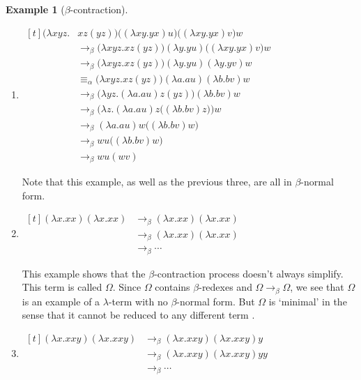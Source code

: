 \documentclass[a4paper, 11pt]{article}
\theoremstyle{plain}
\theoremstyle{definition}
\newtheorem{example}{Example}[section]
\theoremstyle{remark}
\newcommand\acong{\equiv_\alpha}
\newcommand\bcon{\mathrel{\rightarrow_\beta}}
\begin{document}
\begin{example}[$\beta$-contraction]
\begin{enumerate}[(1)]
\item $\begin{aligned}[t]
\big( \lambda xyz . &xz (yz) \big) \big( (\lambda xy . yx) u \big) \big( (\lambda xy . yx) v \big) w \\
    &\bcon \big( \lambda xyz . xz (yz) \big) (\lambda y . yu) \big( (\lambda xy . yx) v \big) w \\
    &\bcon \big( \lambda xyz . xz (yz) \big) (\lambda y . yu) (\lambda y . yv) w \\
    &\acong \big( \lambda xyz . xz (yz) \big) (\lambda a . au) (\lambda b . bv) w \\
    &\bcon \big( \lambda yz . (\lambda a . au) z (yz) \big) (\lambda b . bv) w \\
    &\bcon \Big( \lambda z . (\lambda a . au) z \big( (\lambda b . bv) z \big) \Big) w \\
    &\bcon (\lambda a . au) w \big( (\lambda b . bv) w \big) \\
    &\bcon wu \big( (\lambda b . bv) w \big) \\
    &\bcon wu (wv)
\end{aligned}$

Note that this example, as well as the previous three, are all in $\beta$-normal form.

\item\label{ex:beta-reduction:Omega} $\begin{aligned}[t]
(\lambda x . xx) (\lambda x . xx)
    &\bcon (\lambda x . xx) (\lambda x . xx) \\
    &\bcon (\lambda x . xx) (\lambda x . xx) \\
    &\bcon \dotsb
\end{aligned}$

This example shows that the $\beta$-contraction process doesn't always simplify. This term is called $\Omega$. Since $\Omega$ contains $\beta$-redexes and $\Omega \bcon \Omega$, we see that $\Omega$ is an example of a $\lambda$-term with no $\beta$-normal form. But $\Omega$ is `minimal' in the sense that it cannot be reduced to any different term \parencite[p.~13]{hindley-seldin-2008-lambda-calculus-and-combinators}.

\item $\begin{aligned}[t]
(\lambda x . xxy) (\lambda x . xxy)
    &\bcon (\lambda x . xxy) (\lambda x . xxy) y \\
    &\bcon (\lambda x . xxy) (\lambda x . xxy) yy \\
    &\bcon \dotsb
\end{aligned}$


\end{enumerate}
\end{example}
\end{document}
